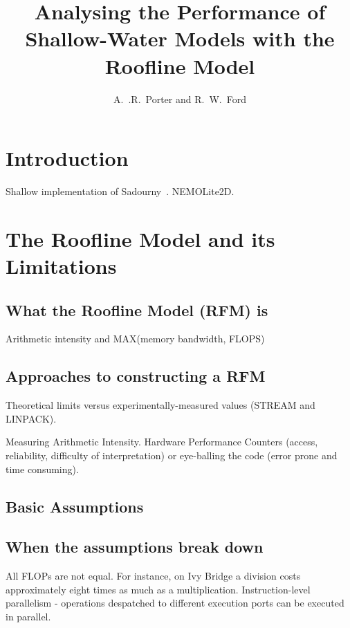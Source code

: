 \documentclass[12pt]{article}
\begin{document}
\title{Analysing the Performance of Shallow-Water Models with the
 Roofline Model}

\author{A.~.R.~Porter and R.~W.~Ford}

\maketitle

\section{Introduction}

Shallow implementation of Sadourny~\cite{sadourny75}.
NEMOLite2D.

\section{The Roofline Model and its Limitations}

\subsection{What the Roofline Model (RFM) is}

Arithmetic intensity and MAX(memory bandwidth, FLOPS)

\subsection{Approaches to constructing a RFM}

Theoretical limits versus experimentally-measured values (STREAM and
LINPACK).

Measuring Arithmetic Intensity. Hardware Performance Counters (access,
reliability, difficulty of interpretation) or eye-balling the code
(error prone and time consuming).

\subsection{Basic Assumptions}
\subsection{When the assumptions break down}

All FLOPs are not equal. For instance, on Ivy Bridge a division costs
approximately eight times as much as a multiplication.
Instruction-level parallelism - operations despatched to different
execution ports can be executed in parallel.
\end{document}
